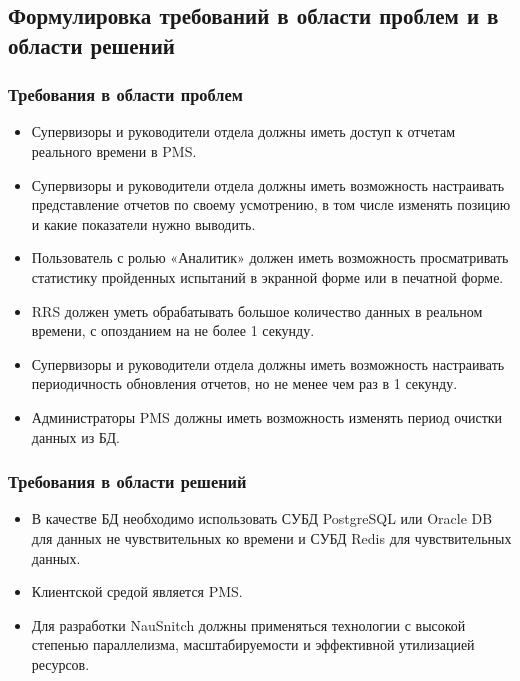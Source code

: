 \subsection{Формулировка требований в области проблем и в области решений} %

\subsubsection{Требования в области проблем}

\begin{itemize}
    \item Супервизоры и руководители отдела должны иметь доступ к отчетам реального времени в PMS\@.
    \item Супервизоры и руководители отдела должны иметь возможность настраивать представление отчетов по своему усмотрению, в том числе изменять позицию и какие показатели нужно выводить.
    \item Пользователь с ролью «Аналитик» должен иметь возможность просматривать статистику пройденных испытаний в экранной форме или в печатной форме.
    \item RRS должен уметь обрабатывать большое количество данных в реальном времени, с опозданием на не более 1 секунду.
    \item Супервизоры и руководители отдела должны иметь возможность настраивать периодичность обновления отчетов, но не менее чем раз в 1 секунду.
    \item Администраторы PMS должны иметь возможность изменять период очистки данных из БД.
\end{itemize}

\subsubsection{Требования в области решений}

\begin{itemize}
    \item В качестве БД необходимо использовать СУБД PostgreSQL или Oracle DB для данных не чувствительных ко времени и СУБД Redis для чувствительных данных.
    \item Клиентской средой является PMS\@.
    \item Для разработки NauSnitch должны применяться технологии с высокой степенью параллелизма, масштабируемости и эффективной утилизацией ресурсов.
\end{itemize}

